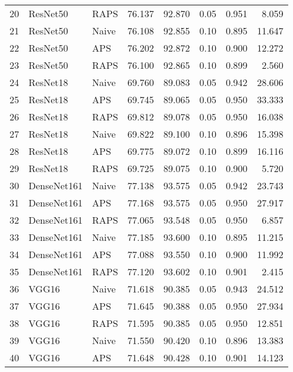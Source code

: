 \begin{tabular}{lllrrrrr}
20 &     ResNet50 &      RAPS &  76.137 &  92.870 &   0.05 &     0.951 &    8.059 \\
21 &     ResNet50 &     Naive &  76.108 &  92.855 &   0.10 &     0.895 &   11.647 \\
22 &     ResNet50 &       APS &  76.202 &  92.872 &   0.10 &     0.900 &   12.272 \\
23 &     ResNet50 &      RAPS &  76.100 &  92.865 &   0.10 &     0.899 &    2.560 \\
24 &     ResNet18 &     Naive &  69.760 &  89.083 &   0.05 &     0.942 &   28.606 \\
25 &     ResNet18 &       APS &  69.745 &  89.065 &   0.05 &     0.950 &   33.333 \\
26 &     ResNet18 &      RAPS &  69.812 &  89.078 &   0.05 &     0.950 &   16.038 \\
27 &     ResNet18 &     Naive &  69.822 &  89.100 &   0.10 &     0.896 &   15.398 \\
28 &     ResNet18 &       APS &  69.775 &  89.072 &   0.10 &     0.899 &   16.116 \\
29 &     ResNet18 &      RAPS &  69.725 &  89.075 &   0.10 &     0.900 &    5.720 \\
30 &  DenseNet161 &     Naive &  77.138 &  93.575 &   0.05 &     0.942 &   23.743 \\
31 &  DenseNet161 &       APS &  77.168 &  93.575 &   0.05 &     0.950 &   27.917 \\
32 &  DenseNet161 &      RAPS &  77.065 &  93.548 &   0.05 &     0.950 &    6.857 \\
33 &  DenseNet161 &     Naive &  77.185 &  93.600 &   0.10 &     0.895 &   11.215 \\
34 &  DenseNet161 &       APS &  77.088 &  93.550 &   0.10 &     0.900 &   11.992 \\
35 &  DenseNet161 &      RAPS &  77.120 &  93.602 &   0.10 &     0.901 &    2.415 \\
36 &        VGG16 &     Naive &  71.618 &  90.385 &   0.05 &     0.943 &   24.512 \\
37 &        VGG16 &       APS &  71.645 &  90.388 &   0.05 &     0.950 &   27.934 \\
38 &        VGG16 &      RAPS &  71.595 &  90.385 &   0.05 &     0.950 &   12.851 \\
39 &        VGG16 &     Naive &  71.550 &  90.420 &   0.10 &     0.896 &   13.383 \\
40 &        VGG16 &       APS &  71.648 &  90.428 &   0.10 &     0.901 &   14.123 \\

\end{tabular}
